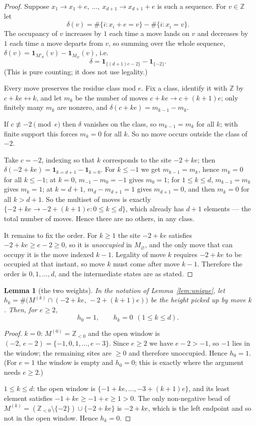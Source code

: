 \documentclass[11pt]{article}
\newtheorem{lemma}[theorem]{Lemma}
\theoremstyle{definition}
\newcommand{\Z}{\mathbb{Z}}
\begin{document}
\begin{proof}
Suppose $x_1\to x_1+e,\ \dots,\ x_{d+1}\to x_{d+1}+e$ is such a sequence.  For $v\in\Z$
let
\[
  \delta(v)=\#\{i:x_i+e=v\}-\#\{i:x_i=v\}.
\]
The occupancy of $v$ increases by $1$ each time a move lands on $v$ and decreases by $1$
each time a move departs from $v$, so summing over the whole sequence,
$\delta(v)=\mathbf 1_{M'_d}(v)-\mathbf 1_{M_\varnothing}(v)$, i.e.
\[
  \delta=\mathbf 1_{\{(d+1)e-2\}}-\mathbf 1_{\{-2\}} .
\]
(This is pure counting; it does not use legality.)

Every move preserves the residue class mod $e$.  Fix a class, identify it with $\Z$ by
$c+ke\leftrightarrow k$, and let $m_k$ be the number of moves $c+ke\to c+(k+1)e$; only
finitely many $m_k$ are nonzero, and $\delta(c+ke)=m_{k-1}-m_k$.

If $c\not\equiv-2\pmod e$ then $\delta$ vanishes on the class, so $m_{k-1}=m_k$ for all
$k$; with finite support this forces $m_k=0$ for all $k$.  So no move occurs outside the
class of $-2$.

Take $c=-2$, indexing so that $k$ corresponds to the site $-2+ke$; then
$\delta(-2+ke)=\mathbf 1_{k=d+1}-\mathbf 1_{k=0}$.  For $k\le-1$ we get $m_{k-1}=m_k$,
hence $m_k=0$ for all $k\le-1$; at $k=0$, $m_{-1}-m_0=-1$ gives $m_0=1$; for $1\le k\le d$,
$m_{k-1}=m_k$ gives $m_k=1$; at $k=d+1$, $m_d-m_{d+1}=1$ gives $m_{d+1}=0$, and then
$m_k=0$ for all $k>d+1$.  So the multiset of moves is exactly
$\{-2+ke\to-2+(k+1)e:0\le k\le d\}$, which already has $d+1$ elements --- the total number
of moves.  Hence there are no others, in any class.

It remains to fix the order.  For $k\ge1$ the site $-2+ke$ satisfies $-2+ke\ge e-2\ge0$,
so it is \emph{unoccupied} in $M_\varnothing$, and the only move that can occupy it is the
move indexed $k-1$.  Legality of move $k$ requires $-2+ke$ to be occupied at that instant,
so move $k$ must come after move $k-1$.  Therefore the order is $0,1,\dots,d$, and the
intermediate states are as stated.
\end{proof}

\begin{lemma}[the two weights]\label{lem:weights}
In the notation of Lemma~\ref{lem:unique}, let $h_k=\#\bigl(M^{(k)}\cap(-2+ke,\,-2+(k+1)e)\bigr)$
be the height picked up by move $k$.  Then, for $e\ge2$,
\[
  h_0=1,\qquad h_k=0\ \ (1\le k\le d).
\]
\end{lemma}

\begin{proof}
$k=0$: $M^{(0)}=\Z_{<0}$ and the open window is $(-2,\,e-2)=\{-1,0,1,\dots,e-3\}$.  Since
$e\ge2$ we have $e-2>-1$, so $-1$ lies in the window; the remaining sites are $\ge0$ and
therefore unoccupied.  Hence $h_0=1$.  (For $e=1$ the window is empty and $h_0=0$; this is
exactly where the argument needs $e\ge2$.)

$1\le k\le d$: the open window is $\{-1+ke,\dots,-3+(k+1)e\}$, and its least element
satisfies $-1+ke\ge-1+e\ge1>0$.  The only non-negative bead of
$M^{(k)}=(\Z_{<0}\setminus\{-2\})\cup\{-2+ke\}$ is $-2+ke$, which is the left endpoint and
so not in the open window.  Hence $h_k=0$.
\end{proof}
\end{document}
